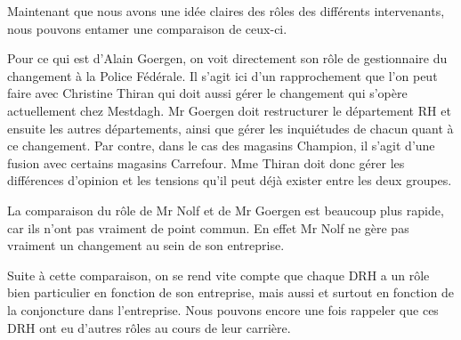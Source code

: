 Maintenant que nous avons une idée claires des rôles des différents intervenants, nous pouvons entamer une comparaison de ceux-ci. 


Pour ce qui est d'Alain Goergen, on voit directement son rôle de gestionnaire du changement à la Police Fédérale. Il s'agit ici d'un rapprochement que l'on peut faire avec Christine Thiran qui doit aussi gérer le changement qui s'opère actuellement chez Mestdagh. Mr Goergen doit restructurer le département RH et ensuite les autres départements, ainsi que gérer les inquiétudes de chacun quant à ce changement. Par contre, dans le cas des magasins Champion, il s'agit d'une fusion avec certains magasins Carrefour. Mme Thiran doit donc gérer les différences d'opinion et les tensions qu'il peut déjà exister entre les deux groupes. 

La comparaison du rôle de Mr Nolf et de Mr Goergen est beaucoup plus rapide, car ils n'ont pas vraiment de point commun. En effet Mr Nolf ne gère pas vraiment un changement au sein de son entreprise. 

Suite à cette comparaison, on se rend vite compte que chaque DRH a un rôle bien particulier en fonction de son entreprise, mais aussi et surtout en fonction de la conjoncture dans l'entreprise. Nous pouvons encore une fois rappeler que ces DRH ont eu d'autres rôles au cours de leur carrière. 